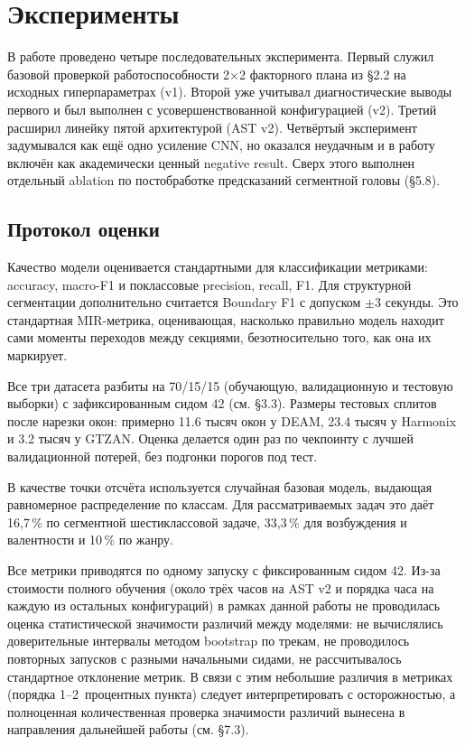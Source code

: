 \chapter{Эксперименты}\label{ch:5}

В работе проведено четыре последовательных эксперимента. Первый служил базовой проверкой работоспособности 2$\times$2 факторного плана из §2.2 на исходных гиперпараметрах (v1). Второй уже учитывал диагностические выводы первого и был выполнен с усовершенствованной конфигурацией (v2). Третий расширил линейку пятой архитектурой (AST v2). Четвёртый эксперимент задумывался как ещё одно усиление CNN, но оказался неудачным и в работу включён как академически ценный negative result. Сверх этого выполнен отдельный ablation по постобработке предсказаний сегментной головы (§5.8).

\section{Протокол оценки}\label{sec:5-1}

Качество модели оценивается стандартными для классификации метриками: accuracy, macro-F1 и поклассовые precision, recall, F1. Для структурной сегментации дополнительно считается Boundary F1 с допуском $\pm 3$ секунды. Это стандартная MIR-метрика, оценивающая, насколько правильно модель находит сами моменты переходов между секциями, безотносительно того, как она их маркирует.

Все три датасета разбиты на 70/15/15 (обучающую, валидационную и тестовую выборки) с зафиксированным сидом 42 (см. §3.3). Размеры тестовых сплитов после нарезки окон: примерно 11.6 тысяч окон у DEAM, 23.4 тысяч у Harmonix и 3.2 тысяч у GTZAN. Оценка делается один раз по чекпоинту с лучшей валидационной потерей, без подгонки порогов под тест.

В качестве точки отсчёта используется случайная базовая модель, выдающая равномерное распределение по классам. Для рассматриваемых задач это даёт 16{,}7\,\% по сегментной шестиклассовой задаче, 33{,}3\,\% для возбуждения и валентности и 10\,\% по жанру.

Все метрики приводятся по одному запуску с фиксированным сидом 42. Из-за стоимости полного обучения (около трёх часов на AST v2 и порядка часа на каждую из остальных конфигураций) в рамках данной работы не проводилась оценка статистической значимости различий между моделями: не вычислялись доверительные интервалы методом bootstrap по трекам, не проводилось повторных запусков с разными начальными сидами, не рассчитывалось стандартное отклонение метрик. В связи с этим небольшие различия в метриках (порядка 1--2~процентных пункта) следует интерпретировать с осторожностью, а полноценная количественная проверка значимости различий вынесена в направления дальнейшей работы (см. §7.3).


